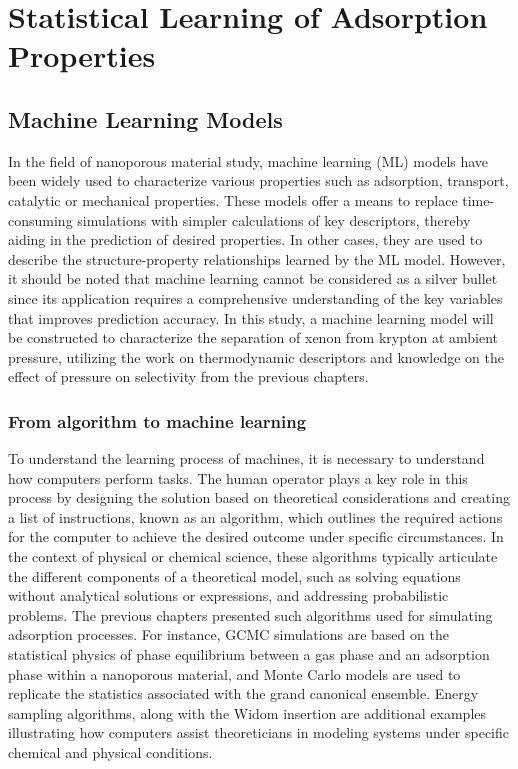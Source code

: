 \documentclass[main]{subfiles}
\begin{document}
\chapter{Statistical Learning of Adsorption Properties}
\vspace*{-1\baselineskip}

\section{Machine Learning Models}

In the field of nanoporous material study, machine learning (ML) models have been widely used to characterize various properties such as adsorption, transport, catalytic or mechanical properties. These models offer a means to replace time-consuming simulations with simpler calculations of key descriptors, thereby aiding in the prediction of desired properties. In other cases, they are used to describe the structure-property relationships learned by the ML model. However, it should be noted that machine learning cannot be considered as a silver bullet since its application requires a comprehensive understanding of the key variables that improves prediction accuracy. In this study, a machine learning model will be constructed to characterize the separation of xenon from krypton at ambient pressure, utilizing the work on thermodynamic descriptors and knowledge on the effect of pressure on selectivity from the previous chapters.

\subsection{From algorithm to machine learning}

To understand the learning process of machines, it is necessary to understand how computers perform tasks. The human operator plays a key role in this process by designing the solution based on theoretical considerations and creating a list of instructions, known as an algorithm, which outlines the required actions for the computer to achieve the desired outcome under specific circumstances. In the context of physical or chemical science, these algorithms typically articulate the different components of a theoretical model, such as solving equations without analytical solutions or expressions, and addressing probabilistic problems. The previous chapters presented such algorithms used for simulating adsorption processes. For instance, GCMC simulations are based on the statistical physics of phase equilibrium between a gas phase and an adsorption phase within a nanoporous material, and Monte Carlo models are used to replicate the statistics associated with the grand canonical ensemble. Energy sampling algorithms, along with the Widom insertion are additional examples illustrating how computers assist theoreticians in modeling systems under specific chemical and physical conditions.
\end{document}
